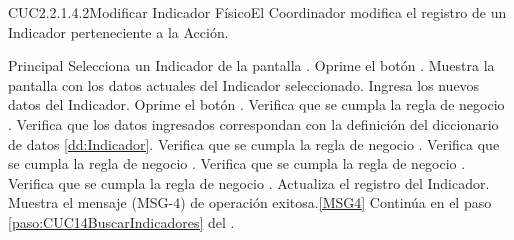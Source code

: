 	\begin{UseCase}{CUC2.2.1.4.2}{Modificar Indicador Físico}{El Coordinador modifica el registro de un Indicador perteneciente a la Acción.}
	\end{UseCase}
% 
	\begin{UCtrayectoria}{Principal}
			\UCpaso[\UCactor] Selecciona un Indicador de la pantalla .
			\UCpaso[\UCactor] Oprime el botón .
			\UCpaso Muestra la pantalla  con los datos actuales del Indicador seleccionado.
			\UCpaso [\UCactor] Ingresa los nuevos datos del Indicador.\label{paso:CUC1.4.2ingresaDatosIndicador}
			\UCpaso [\UCactor] Oprime el botón .
			\UCpaso Verifica que se cumpla la regla de negocio . 
			\UCpaso Verifica que los datos ingresados correspondan  con la definición del diccionario de datos \ref{dd:Indicador}. 
			\UCpaso Verifica que se cumpla la regla de negocio .
			\UCpaso Verifica que se cumpla la regla de negocio .
			\UCpaso Verifica que se cumpla la regla de negocio .
			\UCpaso Verifica que se cumpla la regla de negocio .
			\UCpaso Actualiza el registro del Indicador.
			\UCpaso Muestra el mensaje (MSG-4) de operación exitosa.\ref{MSG4}
			\UCpaso Continúa en el paso \ref{paso:CUC14BuscarIndicadores} del .
	\end{UCtrayectoria}
